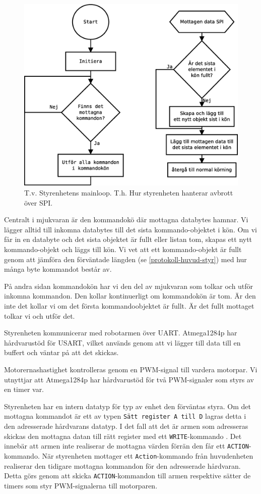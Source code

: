 \begin{figure}[h!]
	\centering
	\includegraphics[scale=0.4]{grafik/styr-mjukvara}
	\caption{T.v. Styrenhetens mainloop. T.h. Hur styrenheten hanterar avbrott över SPI.} \label{styr-mjukvara}
\end{figure}

Centralt i mjukvaran är den kommandokö där mottagna databytes hamnar. Vi lägger alltid till inkomna databytes till det sista kommando-objektet i kön. Om vi får in en databyte och det sista objektet är fullt eller listan tom, skapas ett nytt kommando-objekt och läggs till kön. Vi vet att ett kommando-objekt är fullt genom att jämföra den förväntade längden (se \ref{protokoll-huvud-styr}) med hur många byte kommandot består av.

På andra sidan kommandokön har vi den del av mjukvaran som tolkar och utför inkomna kommandon. Den kollar kontinuerligt om kommandokön är tom. Är den inte det kollar vi om det första kommandoobjektet är fullt. Är det fullt mottaget tolkar vi och utför det.

Styrenheten kommunicerar med robotarmen över UART. Atmega1284p har hårdvarustöd för USART, vilket används genom att vi lägger till data till en buffert och väntar på att det skickas.

Motorernashastighet kontrolleras genom en PWM-signal till vardera motorpar. Vi utnyttjar att Atmega1284p har hårdvarustöd för två PWM-signaler som styrs av en timer var.

Styrenheten har en intern datatyp för typ av enhet den förväntas styra. Om det mottagna kommandot är ett av typen \texttt{Sätt register A till D} lagras detta i den adresserade hårdvarans datatyp. I det fall att det är armen som adresseras skickas den mottagna datan till rätt register med ett \texttt{WRITE}-kommando \cite{servo}. Det innebär att armen inte realiserar de mottagna värden förrän den får ett \texttt{ACTION}-kommando. När styrenheten mottager ett \texttt{Action}-kommando från huvudenheten realiserar den tidigare mottagna kommandon för den adresserade hårdvaran. Detta görs genom att skicka \texttt{ACTION}-kommandon till armen respektive sätter de timers som styr PWM-signalerna till motorparen.

